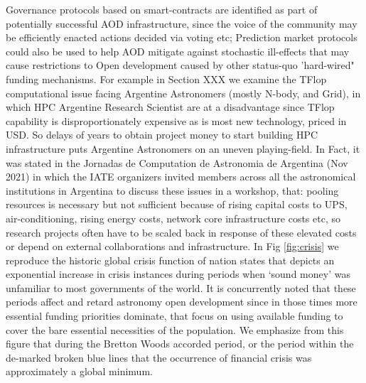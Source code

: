 \documentclass[final,5p,times,twocolumn,authoryear]{elsarticle}
\begin{document}

Governance protocols based on smart-contracts are identified as part of potentially successful AOD infrastructure, since the voice of the community may be efficiently enacted  actions decided via voting etc; Prediction market protocols could also be used to help AOD mitigate against stochastic ill-effects that may cause restrictions to Open development caused by other status-quo 'hard-wired" funding mechanisms. For example in Section XXX we examine the TFlop computational issue facing Argentine Astronomers (mostly N-body, and Grid), in which HPC Argentine Research Scientist are at a disadvantage since TFlop capability is disproportionately expensive as is most new technology, priced in USD. So delays of years to obtain project money to start building HPC infrastructure puts Argentine Astronomers on an uneven playing-field. In Fact, it was stated in the Jornadas de Computation de Astronomia de Argentina (Nov 2021)  in which the IATE organizers invited members across all the astronomical institutions in Argentina to discuss these issues in a workshop, that: pooling resources is necessary but not sufficient because of rising capital costs to UPS, air-conditioning, rising energy costs, network core infrastructure costs etc, so research projects often have to be scaled back in response of these elevated costs or depend on external  collaborations and infrastructure. In Fig \ref{fig:crisis} we reproduce the historic global crisis function of nation states that depicts an exponential increase in crisis instances during periods when `sound money' was  unfamiliar to most governments of the world. It is concurrently noted that these periods affect and retard astronomy open development since in those times more essential funding priorities dominate, that focus on using available funding to cover the bare essential necessities of the population. We emphasize from this figure that during the Bretton Woods accorded period, or the period within the de-marked broken blue lines that the occurrence of financial crisis was approximately a global minimum. 
\end{document}

